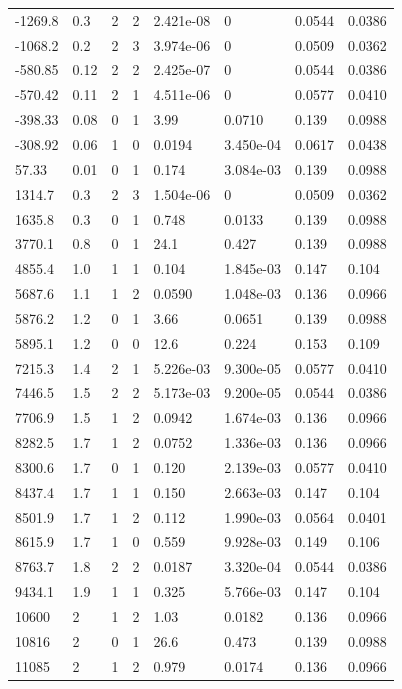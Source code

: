 \documentclass[preview]{standalone}
\begin{document}
{{\begin{tabular}{L{1.2cm}C{1.2cm} C{0.3cm}C{0.5cm} C{1.4cm}C{1.4cm} C{1.4cm}C{1.4cm}}
  -1269.8  &   0.3  & 2     &  2 &  2.421e-08  & 0  & 0.0544 &  0.0386   \\ 
  -1068.2  &   0.2  & 2     &  3 &  3.974e-06  & 0  & 0.0509 &  0.0362   \\ 
  -580.85  &  0.12  & 2     &  2 &  2.425e-07  & 0  & 0.0544 &  0.0386   \\ 
  -570.42  &  0.11  & 2     &  1 &  4.511e-06  & 0  & 0.0577 &  0.0410   \\ 
  -398.33  &  0.08  & 0     &  1 &  3.99  & 0.0710  & 0.139 &  0.0988   \\ 
  -308.92  &  0.06  & 1     &  0 &  0.0194  & 3.450e-04  & 0.0617 &  0.0438   \\ 
  57.33  &  0.01  & 0     &  1 &  0.174  & 3.084e-03  & 0.139 &  0.0988   \\ 
  1314.7  &   0.3  & 2     &  3 &  1.504e-06  & 0  & 0.0509 &  0.0362   \\ 
  1635.8  &   0.3  & 0     &  1 &  0.748  & 0.0133  & 0.139 &  0.0988   \\ 
  3770.1  &   0.8  & 0     &  1 &  24.1  & 0.427  & 0.139 &  0.0988   \\ 
  4855.4  &   1.0  & 1     &  1 &  0.104  & 1.845e-03  & 0.147 &  0.104   \\ 
  5687.6  &   1.1  & 1     &  2 &  0.0590  & 1.048e-03  & 0.136 &  0.0966   \\ 
  5876.2  &   1.2  & 0     &  1 &  3.66  & 0.0651  & 0.139 &  0.0988   \\ 
  5895.1  &   1.2  & 0     &  0 &  12.6  & 0.224  & 0.153 &  0.109   \\ 
  7215.3  &   1.4  & 2     &  1 &  5.226e-03  & 9.300e-05  & 0.0577 &  0.0410   \\ 
  7446.5  &   1.5  & 2     &  2 &  5.173e-03  & 9.200e-05  & 0.0544 &  0.0386   \\ 
  7706.9  &   1.5  & 1     &  2 &  0.0942  & 1.674e-03  & 0.136 &  0.0966   \\ 
  8282.5  &   1.7  & 1     &  2 &  0.0752  & 1.336e-03  & 0.136 &  0.0966   \\ 
  8300.6  &   1.7  & 0     &  1 &  0.120  & 2.139e-03  & 0.0577 &  0.0410   \\ 
  8437.4  &   1.7  & 1     &  1 &  0.150  & 2.663e-03  & 0.147 &  0.104   \\ 
  8501.9  &   1.7  & 1     &  2 &  0.112  & 1.990e-03  & 0.0564 &  0.0401   \\ 
  8615.9  &   1.7  & 1     &  0 &  0.559  & 9.928e-03  & 0.149 &  0.106   \\ 
  8763.7  &   1.8  & 2     &  2 &  0.0187  & 3.320e-04  & 0.0544 &  0.0386   \\ 
  9434.1  &   1.9  & 1     &  1 &  0.325  & 5.766e-03  & 0.147 &  0.104   \\ 
  10600  &     2  & 1     &  2 &  1.03  & 0.0182  & 0.136 &  0.0966   \\ 
  10816  &     2  & 0     &  1 &  26.6  & 0.473  & 0.139 &  0.0988   \\ 
  11085  &     2  & 1     &  2 &  0.979  & 0.0174  & 0.136 &  0.0966   \\ 
\hline 
\end{tabular} 

}}
\end{document}
